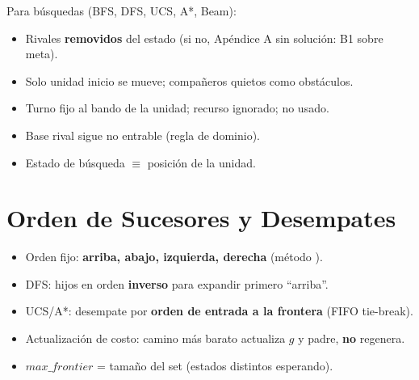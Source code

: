 Para búsquedas (BFS, DFS, UCS, A*, Beam):
\begin{itemize}
\item Rivales \textbf{removidos} del estado (si no, Apéndice A sin solución: B1 sobre meta).
\item Solo unidad inicio se mueve; compañeros quietos como obstáculos.
\item Turno fijo al bando de la unidad; recurso ignorado;  no usado.
\item Base rival sigue no entrable (regla de dominio).
\item Estado de búsqueda $\equiv$ posición de la unidad.
\end{itemize}

\section{Orden de Sucesores y Desempates}
\label{sec:orden-desempates}

\begin{itemize}
\item Orden fijo: \textbf{arriba, abajo, izquierda, derecha} (método ).
\item DFS: hijos en orden \textbf{inverso} para expandir primero ``arriba''.
\item UCS/A*: desempate por \textbf{orden de entrada a la frontera} (FIFO tie-break).
\item Actualización de costo: camino más barato actualiza $g$ y padre, \textbf{no} regenera.
\item $max\_frontier$ = tamaño del set  (estados distintos esperando).
\end{itemize}